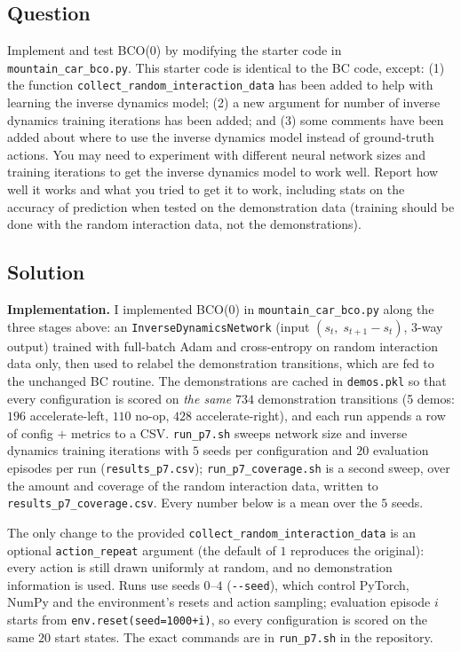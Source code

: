 \documentclass[12pt]{article}%
\begin{document}
\subsection{Question}
\begin{sloppypar}
Implement and test BCO(0) by modifying the starter code in
\texttt{mountain\_car\_bco.py}. This starter code is identical to the BC code,
except: (1) the function \texttt{collect\_random\_interaction\_data} has been
added to help with learning the inverse dynamics model; (2) a new argument for
number of inverse dynamics training iterations has been added; and (3) some
comments have been added about where to use the inverse dynamics model instead of
ground-truth actions. You may need to experiment with different neural network
sizes and training iterations to get the inverse dynamics model to work well.
Report how well it works and what you tried to get it to work, including stats on
the accuracy of prediction when tested on the demonstration data (training should
be done with the random interaction data, not the demonstrations).
\end{sloppypar}

\subsection{Solution}
\textbf{Implementation.} I implemented BCO(0) in \texttt{mountain\_car\_bco.py} along the
three stages above: an \texttt{InverseDynamicsNetwork} (input $(s_t,\; s_{t+1} - s_t)$,
3-way output) trained with full-batch Adam and cross-entropy on random interaction data
only, then used to relabel the demonstration transitions, which are fed to the unchanged BC
routine. The demonstrations are cached in \texttt{demos.pkl} so that every configuration is
scored on \emph{the same} $734$ demonstration transitions (5 demos: $196$ accelerate-left,
$110$ no-op, $428$ accelerate-right), and each run appends a row of config $+$ metrics to a
CSV. \texttt{run\_p7.sh} sweeps network size and inverse dynamics training iterations with
$5$ seeds per configuration and $20$ evaluation episodes per run
(\texttt{results\_p7.csv}); \texttt{run\_p7\_coverage.sh} is a second sweep, over the amount and
coverage of the random interaction data, written to
\texttt{results\_p7\_coverage.csv}. Every number below is a mean
over the $5$ seeds.

\begin{sloppypar}
\noindent The only change to the provided \texttt{collect\_random\_interaction\_data} is an
optional \texttt{action\_repeat} argument (the default of $1$ reproduces the original):
every action is still drawn uniformly at random, and no demonstration information is used.
Runs use seeds $0$--$4$ (\texttt{-{}-seed}), which control PyTorch, NumPy and the
environment's resets and action sampling; evaluation episode $i$ starts from
\texttt{env.reset(seed=1000+i)}, so every configuration is scored on the same $20$ start
states. The exact commands are in \texttt{run\_p7.sh} in the repository.
\end{sloppypar}
\end{document}
